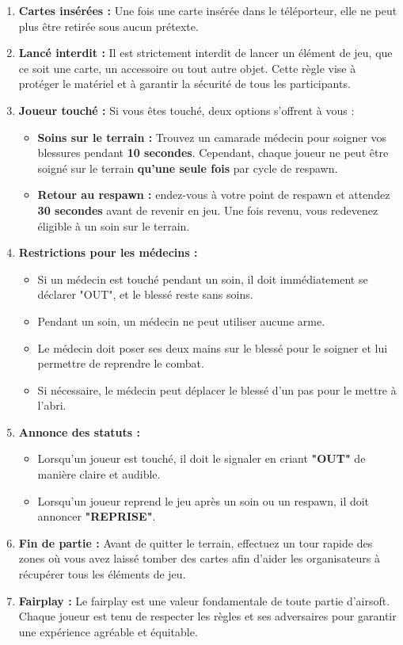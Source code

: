 \documentclass{template}
\begin{document}
\begin{enumerate}
    \item \textbf{Cartes insérées :} Une fois une carte insérée dans le téléporteur, elle ne peut plus être retirée sous aucun prétexte.
    \item \textbf{Lancé interdit :} Il est strictement interdit de lancer un élément de jeu, que ce soit une carte, un accessoire ou tout autre objet. Cette règle vise à protéger le matériel et à garantir la sécurité de tous les participants.
    \item \textbf{Joueur touché :} Si vous êtes touché, deux options s'offrent à vous :
    \begin{itemize}
        \item \textbf{Soins sur le terrain :} Trouvez un camarade médecin pour soigner vos blessures pendant \textbf{10 secondes}. Cependant, chaque joueur ne peut être soigné sur le terrain \textbf{qu'une seule fois} par cycle de respawn. 
        \item \textbf{Retour au respawn :} endez-vous à votre point de respawn et attendez \textbf{30 secondes} avant de revenir en jeu. Une fois revenu, vous redevenez éligible à un soin sur le terrain.
    \end{itemize}
    \item \textbf{Restrictions pour les médecins :}
    \begin{itemize}
        \item Si un médecin est touché pendant un soin, il doit immédiatement se déclarer "OUT", et le blessé reste sans soins.
        \item Pendant un soin, un médecin ne peut utiliser aucune arme.
        \item Le médecin doit poser ses deux mains sur le blessé pour le soigner et lui permettre de reprendre le combat.
        \item Si nécessaire, le médecin peut déplacer le blessé d’un pas pour le mettre à l’abri.
    \end{itemize}
    \item \textbf{Annonce des statuts :}
    \begin{itemize}
        \item Lorsqu'un joueur est touché, il doit le signaler en criant \textbf{"OUT"} de manière claire et audible.
        \item Lorsqu'un joueur reprend le jeu après un soin ou un respawn, il doit annoncer \textbf{"REPRISE"}. 
    \end{itemize}
    \item \textbf{Fin de partie :} Avant de quitter le terrain, effectuez un tour rapide des zones où vous avez laissé tomber des cartes afin d’aider les organisateurs à récupérer tous les éléments de jeu.
    \item \textbf{Fairplay :} Le fairplay est une valeur fondamentale de toute partie d'airsoft. Chaque joueur est tenu de respecter les règles et ses adversaires pour garantir une expérience agréable et équitable.
\end{enumerate}
\end{document}
